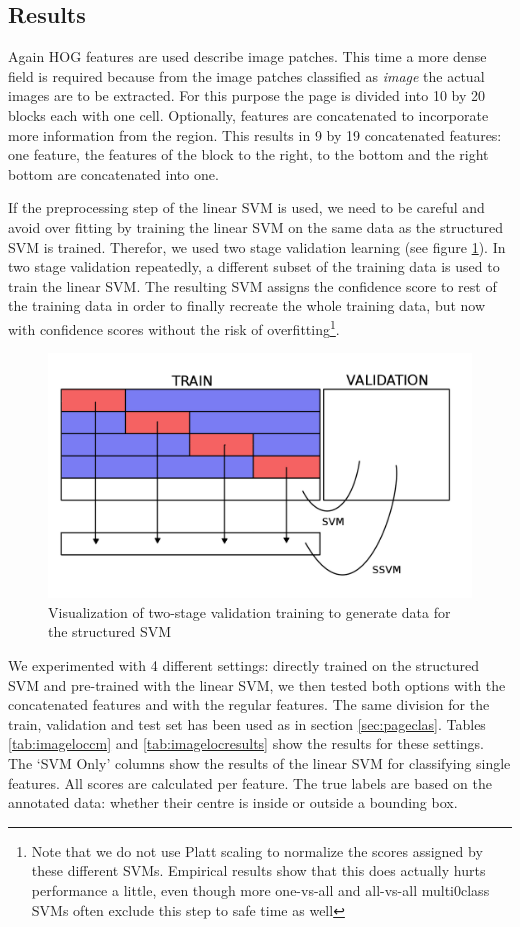 \subsection{Results}
\label{subsec:imagelocresults}

Again HOG features are used describe image patches. This time a more dense field
is required because from the image patches classified as \emph{image} the actual
images are to be extracted. For this purpose the page is divided into 10 by 20
blocks each with one cell. Optionally, features are concatenated to incorporate
more information from the region. This results in 9 by 19 concatenated
features: one feature, the features of the block to the right, to the bottom and
the right bottom are concatenated into one.

If the preprocessing step of the linear SVM is used, we need to be careful and
avoid over fitting by training the linear SVM on the same data as the structured
SVM is trained. Therefor, we used two stage validation learning (see figure
\ref{fig:twostage}). In two stage validation repeatedly, a different subset of
the training data is used to train the linear SVM. The resulting SVM assigns the
confidence score to rest of the training data in order to finally recreate the
whole training data, but now with confidence scores without the risk of
overfitting\footnote{Note that we do not use Platt scaling to normalize the
scores assigned by these different SVMs. Empirical results show that this does
actually hurts performance a little, even though more one-vs-all and all-vs-all
multi0class SVMs often exclude this step to safe time as well\cite{duan2005best}}.

\begin{figure}
\includegraphics[width=.5\textwidth]{resources/twostage}
\caption{Visualization of two-stage validation training to generate data for the
structured SVM}
\label{fig:twostage}
\end{figure}

We experimented with 4 different settings: directly trained on the structured
SVM and pre-trained with the linear SVM, we then tested both options with the
concatenated features and with the regular features. The same division for the
train, validation and test set has been used as in section \ref{sec:pageclas}.
Tables \ref{tab:imageloccm} and \ref{tab:imagelocresults} show the results for
these settings. The `SVM Only' columns show the results of the
linear SVM for classifying single features. All scores are calculated per
feature. The true labels are based on the annotated data: whether their centre
is inside or outside a bounding box.

